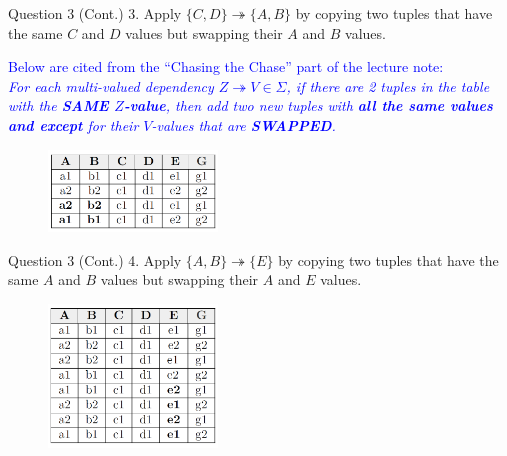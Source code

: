 \begin{frame}[fragile]{Question 3 (Cont.)}
3. Apply $\{C,D\} \twoheadrightarrow \{A,B\}$ by copying two tuples that have the same $C$ and $D$ values but swapping their $A$ and $B$ values.\\\vspace{10pt}

\textcolor{blue}{{\small Below are cited from the ``Chasing the Chase'' part of the lecture note:\\\vspace{5pt}
\textit{For each multi-valued dependency $Z\twoheadrightarrow V\in\Sigma$, if there are 2 tuples in the table with the \textbf{SAME $Z$-value}, then add two new tuples with \textbf{all the same values and except} for their $V$-values that are \textbf{SWAPPED}.}}}

\begin{figure}
	\includegraphics[width=0.4\textwidth, trim=0 0 0 0, clip]{4221-t5/images/3-3.png}
\end{figure}

\end{frame}


\begin{frame}[fragile]{Question 3 (Cont.)}
4. Apply $\{A,B\} \twoheadrightarrow \{E\}$ by copying two tuples that have the same $A$ and $B$ values but swapping their $A$ and $E$ values.\\
\begin{figure}
	\includegraphics[width=0.4\textwidth, trim=0 0 0 0, clip]{4221-t5/images/3-4.png}
\end{figure}
\end{frame}



